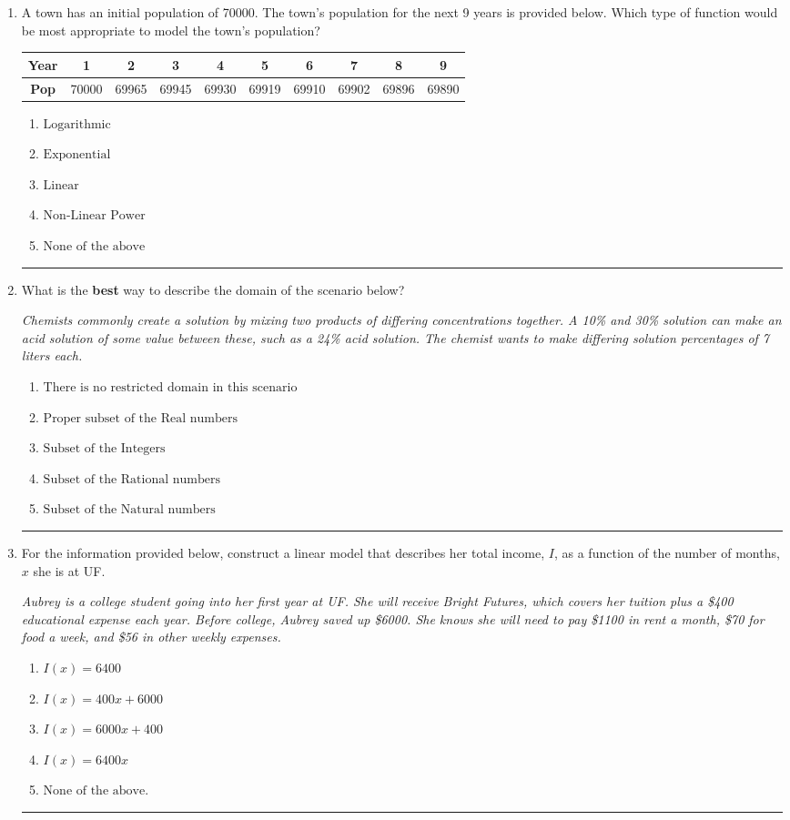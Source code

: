 \documentclass[14pt]{extbook}
\newcommand{\litem}[1]{\item#1\hspace*{-1cm}\rule{\textwidth}{0.4pt}}
\begin{document}
\begin{enumerate}
{\begin{enumerate}[label=\Alph*.]
\end{enumerate} }
\litem{
A town has an initial population of 70000. The town's population for the next 9 years is provided below. Which type of function would be most appropriate to model the town's population?

\begin{tabular}{c|c|c|c|c|c|c|c|c|c}
\textbf{Year} &1 &2 &3 &4 &5 &6 &7 &8 &9\tabularnewline \hline
\textbf{Pop} &70000 &69965 &69945 &69930 &69919 &69910 &69902 &69896 &69890\end{tabular}\begin{enumerate}[label=\Alph*.]
\item \( \text{Logarithmic} \)
\item \( \text{Exponential} \)
\item \( \text{Linear} \)
\item \( \text{Non-Linear Power} \)
\item \( \text{None of the above} \)

\end{enumerate} }
\litem{
What is the \textbf{best} way to describe the domain of the scenario below?
\begin{center}
    \textit{ Chemists commonly create a solution by mixing two products of differing concentrations together. A 10\% and 30\% solution can make an acid solution of some value between these, such as a 24\% acid solution. The chemist wants to make differing solution percentages of 7 liters each. }
\end{center}
\begin{enumerate}[label=\Alph*.]
\item \( \text{There is no restricted domain in this scenario} \)
\item \( \text{Proper subset of the Real numbers} \)
\item \( \text{Subset of the Integers} \)
\item \( \text{Subset of the Rational numbers} \)
\item \( \text{Subset of the Natural numbers} \)

\end{enumerate} }
\litem{
For the information provided below, construct a linear model that describes her total income, $I$, as a function of the number of months, $x$ she is at UF.
\begin{center}
    \textit{ Aubrey is a college student going into her first year at UF. She will receive Bright Futures, which covers her tuition plus a \$400 educational expense each year. Before college, Aubrey saved up \$6000. She knows she will need to pay \$1100 in rent a month, \$70 for food a week, and \$56 in other weekly expenses. }
\end{center}
\begin{enumerate}[label=\Alph*.]
\item \( I(x) = 6400 \)
\item \( I(x) = 400 x + 6000 \)
\item \( I(x) = 6000 x + 400 \)
\item \( I(x) = 6400 x \)
\item \( \text{None of the above.} \)


\end{enumerate}}
\end{enumerate}
\end{document}
